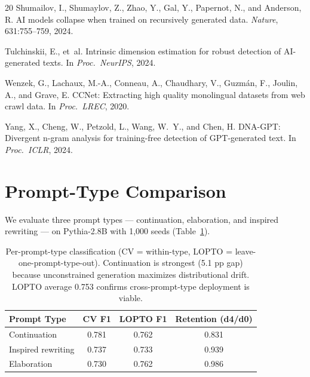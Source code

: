 \documentclass[11pt,twocolumn]{article}
\begin{document}
{\begin{thebibliography}{20}
Shumailov, I., Shumaylov, Z., Zhao, Y., Gal, Y., Papernot, N., and Anderson, R.
\newblock AI models collapse when trained on recursively generated data.
\newblock \emph{Nature}, 631:755--759, 2024.

Tulchinskii, E., et~al.
\newblock Intrinsic dimension estimation for robust detection of AI-generated texts.
\newblock In \emph{Proc.\ NeurIPS}, 2024.

Wenzek, G., Lachaux, M.-A., Conneau, A., Chaudhary, V., Guzm{\'a}n, F., Joulin, A., and Grave, E.
\newblock CCNet: Extracting high quality monolingual datasets from web crawl data.
\newblock In \emph{Proc.\ LREC}, 2020.

Yang, X., Cheng, W., Petzold, L., Wang, W.~Y., and Chen, H.
\newblock DNA-GPT: Divergent n-gram analysis for training-free detection of GPT-generated text.
\newblock In \emph{Proc.\ ICLR}, 2024.

\end{thebibliography}
}

\appendix
\onecolumn

\section{Prompt-Type Comparison}
\label{sec:prompttype}

We evaluate three prompt types --- continuation, elaboration, and inspired rewriting --- on Pythia-2.8B with 1,000 seeds (Table~\ref{tab:prompttype}).

\begin{table}[h]
\centering
\small
\begin{tabular}{lccc}
\toprule
\textbf{Prompt Type} & \textbf{CV F1} & \textbf{LOPTO F1} & \textbf{Retention (d4/d0)} \\
\midrule
Continuation & 0.781 & 0.762 & 0.831 \\
Inspired rewriting & 0.737 & 0.733 & 0.939 \\
Elaboration & 0.730 & 0.762 & 0.986 \\
\bottomrule
\end{tabular}
\caption{Per-prompt-type classification (CV = within-type, LOPTO = leave-one-prompt-type-out). Continuation is strongest (5.1 pp gap) because unconstrained generation maximizes distributional drift. LOPTO average 0.753 confirms cross-prompt-type deployment is viable.}
\label{tab:prompttype}
\end{table}
\end{document}
